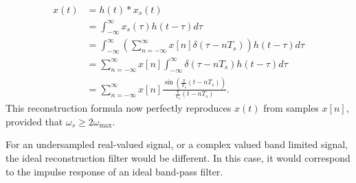 \begin{align}
 x(t) &= h(t)*x_s(t)\\
 &= \int_{-\infty}^{\infty} x_s(\tau)h(t-\tau)d\tau\\
 &= \int_{-\infty}^{\infty}\left( \sum_{n=-\infty}^{\infty} x[n] \delta(\tau-n T_s)\right) h(t-\tau) d\tau \\
&= \sum_{n=-\infty}^{\infty} x[n] \int_{-\infty}^{\infty} \delta(\tau-nT_s) h(t-\tau)d\tau \\
&= \sum_{n=-\infty}^{\infty} x[n] \frac{\sin(\frac{\pi}{T_s}(t-n T_s))}{\frac{\pi}{T_s}(t-nT_s)}.
\end{align}
This reconstruction formula now perfectly reproduces $x(t)$ from
samples $x[n]$, provided that $\omega_s \ge 2\omega_{\mathrm{max}}$.

For an undersampled real-valued signal, or a complex valued band limited signal, the ideal reconstruction filter would be different. In this case, it would correspond to the impulse response of an ideal band-pass filter.
